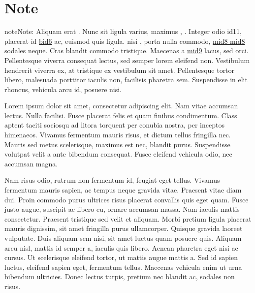 \documentclass[letterpaper,10pt,english]{sphinxmanual}
\begin{document}
\section{Note}
\label{\detokenize{test:note}}
\begin{sphinxadmonition}{note}{Note:}
\sphinxAtStartPar
Aliquam erat \hyperlink{\detokenize{id2}}{}. Nunc sit \hyperlink{\detokenize{id5}}{} ligula varius, maximus
\hyperlink{\detokenize{id8}}{}, \hyperlink{\detokenize{id9}}{} \hyperlink{\detokenize{id10}}{}. Integer odio
\hypertarget{\detokenize{id11}}{id11}, placerat id \hyperlink{\detokenize{bid6-ref46}}{\hypertarget{\detokenize{bid6}}{bid6}} ac, euismod quis ligula.
\hyperlink{\detokenize{bid1}}{\hypertarget{\detokenize{bid1-ref38}}{}} nisi \hyperlink{\detokenize{bid2}}{\hypertarget{\detokenize{bid2-ref39}}{}}, porta \hyperlink{\detokenize{bid4}}{\hypertarget{\detokenize{bid4-ref40}}{}} nulla
commodo, \hyperlink{\detokenize{test-mid8-id0}}{\hypertarget{\detokenize{test-mid8-id1}}{mid8 mid8}} sodales neque. Cras blandit commodo tristique. Maecenas a
\hyperlink{\detokenize{test-mid9-id1}}{\hypertarget{\detokenize{test-mid9-id0}}{mid9}} lacus, sed \hyperlink{\detokenize{id12}}{} orci.
Pellentesque viverra consequat lectus, sed semper lorem eleifend non. Vestibulum hendrerit viverra
ex, at tristique ex vestibulum sit amet. Pellentesque tortor libero, malesuada porttitor iaculis
non, facilisis pharetra sem. Suspendisse in elit rhoncus, vehicula arcu id, posuere nisi.
\end{sphinxadmonition}

\sphinxAtStartPar
Lorem ipsum dolor sit amet, consectetur adipiscing elit. Nam vitae accumsan lectus. Nulla facilisi.
Fusce placerat felis et quam finibus condimentum. Class aptent taciti sociosqu ad litora torquent
per conubia nostra, per inceptos himenaeos. Vivamus fermentum mauris risus, et dictum tellus
fringilla nec. Mauris sed metus scelerisque, maximus est nec, blandit purus. Suspendisse volutpat
velit a ante bibendum consequat. Fusce eleifend vehicula odio, nec accumsan magna.

\sphinxAtStartPar
Nam risus odio, rutrum non fermentum id, feugiat eget tellus. Vivamus fermentum mauris sapien, ac
tempus neque gravida vitae. Praesent vitae diam dui. Proin commodo purus ultrices risus placerat
convallis quis eget quam. Fusce justo augue, suscipit ac libero eu, ornare accumsan massa. Nam
iaculis mattis consectetur. Praesent tristique sed velit et aliquam. Morbi pretium ligula placerat
mauris dignissim, sit amet fringilla purus ullamcorper. Quisque gravida laoreet vulputate. Duis
aliquam sem nisi, sit amet luctus quam posuere quis. Aliquam arcu nisl, mattis id semper a, iaculis
quis libero. Aenean pharetra eget nisi ac cursus. Ut scelerisque eleifend tortor, ut mattis augue
mattis a. Sed id sapien luctus, eleifend sapien eget, fermentum tellus. Maecenas vehicula enim ut
urna bibendum ultricies. Donec lectus turpis, pretium nec blandit ac, sodales non risus.
\end{document}
